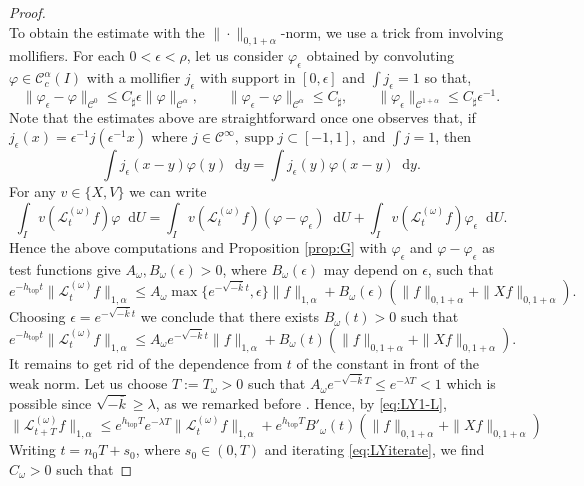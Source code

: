 \documentclass[11pt,letterpaper]{amsart}
\newcommand \cL {{\mathcal L}}
\newcommand \cC {{\mathscr{C}}}
\newcommand \sC {{C_\sharp}}
\newcommand*{\diff}{\mathop{}\!\mathrm{d}}
\DeclareMathOperator{\topp}{top}
\theoremstyle{definition}
\begin{document}
\begin{proof}
\[\]
To obtain the estimate with the $\|\cdot\|_{0,1+\alpha}$-norm, we use a trick from \cite{GoLi} involving mollifiers. For each $0<\epsilon<\rho$, let us consider $\varphi_\epsilon$ obtained by convoluting $\varphi \in \cC_c^{\alpha}(I)$ with a mollifier $j_\epsilon$ with support in $[0,\epsilon]$ and $\int j_\epsilon=1$ so that,
\begin{equation}\label{eq:molly}
\|\varphi_\epsilon-\varphi\|_{\cC^{0}}\le \sC\epsilon \|\varphi\|_{\cC^{\alpha}}, \qquad \|\varphi_\epsilon-\varphi \|_{\cC^{\alpha}}\le \sC, \qquad \|\varphi_\epsilon\|_{\cC^{1+\alpha}}\le \sC \epsilon^{-1}.
\end{equation}
Note that the estimates above are straightforward once one observes that, if $j_\epsilon (x)=\epsilon^{-1}j(\epsilon^{-1} x)$ where $j\in \cC^{\infty}, \operatorname{supp}j \subset [-1,1],$ and $ \int j =1$, then
\[
\int j_\epsilon(x-y) \varphi(y)\diff y=\int j_\epsilon (y) \varphi (x-y)\diff y.
\]
For any $v\in \{X,V\}$ we can write
\[
\int_{I} v(\cL^{(\omega)}_tf)\varphi \diff U = \int_{I} v(\cL^{(\omega)}_tf)(\varphi-\varphi_\epsilon) \diff U+\int_{I} v(\cL^{(\omega)}_tf)\varphi_\epsilon \diff U.
\]
Hence the above computations and Proposition \ref{prop:G} with $\varphi_\epsilon$ and $\varphi-\varphi_\epsilon$ as test functions give $A_\omega,B_\omega(\epsilon)>0$, where $B_\omega(\epsilon)$ may depend on $\epsilon$, such that
\[
e^{-h_{\topp}t}\|\cL^{(\omega)}_t f\|_{1,\alpha} \le A_\omega \max\{e^{-\sqrt{-\overline k}t}, \epsilon\} \|f\|_{1,\alpha} +B_\omega(\epsilon)(\|f\|_{0,1+\alpha}+\|Xf\|_{0,1+\alpha}).
\]
Choosing $\epsilon=e^{-\sqrt{-\overline k}t}$ we conclude that there exists $B_\omega(t)>0$ such that
\[
e^{-h_{\topp}t}\|\cL^{(\omega)}_t f\|_{1,\alpha} \le A_\omega e^{-\sqrt{-\overline k}t} \|f\|_{1,\alpha} +B_\omega(t)(\|f\|_{0,1+\alpha}+\|Xf\|_{0,1+\alpha}).
\]
It remains to get rid of the dependence from $t$ of the constant in front of the weak norm. Let us choose $T:=T_\omega >0$ such that $A_\omega e^{-\sqrt{-\overline k}T}\le e^{-\lambda T} <1$ which is possible since $\sqrt{-\overline k}\ge \lambda$, as we remarked before . Hence, by \eqref{eq:LY1-L},
\begin{equation}\label{eq:LYiterate}
\|\cL^{(\omega)}_{t+T} f\|_{1,\alpha} \le  e^{h_{\topp}T}e^{-\lambda T} \|\cL^{(\omega)}_tf\|_{1,\alpha} +e^{h_{\topp}T}B'_\omega(t) (\|f\|_{0,1+\alpha}+\|Xf\|_{0,1+\alpha})
\end{equation}
Writing $t=n_0T+s_0$, where $s_0\in (0,T)$ and iterating \eqref{eq:LYiterate}, we find $C_\omega>0$ such that

\end{proof}
\end{document}
